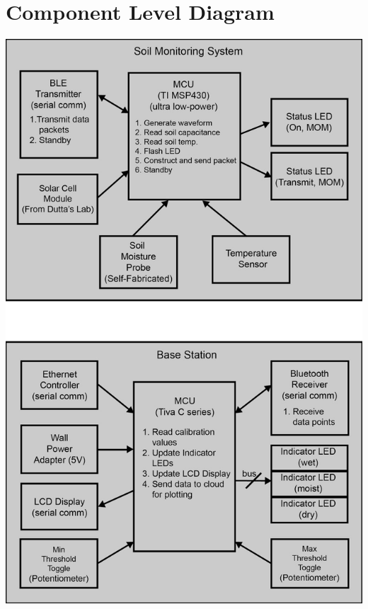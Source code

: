 \documentclass{article}
\begin{document}
\section{Component Level Diagram}
\begin{center}
    \includegraphics[height=0.9\textheight]{component_diagram.png}
\end{center}
\end{document}

